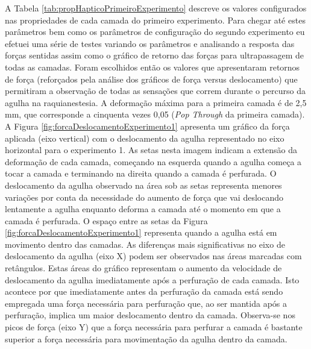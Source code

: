 A Tabela \ref{tab:propHapticoPrimeiroExperimento} descreve os valores configurados nas propriedades de cada camada do primeiro experimento. Para chegar até estes parâmetros bem como os parâmetros de configuração do segundo experimento eu efetuei uma série de testes variando os parâmetros e analisando a resposta das forças sentidas assim como o gráfico de retorno das forças para ultrapassagem de todas as camadas. Foram escolhidos então os valores que apresentaram retornos de força (reforçados pela análise dos gráficos de força versus deslocamento) que permitiram a observação de todas as sensações que correm durante o percurso da agulha na raquianestesia. A deformação máxima para a primeira camada é de 2,5 mm, que corresponde a cinquenta vezes 0,05 (\textit{Pop Through} da primeira camada). A Figura \ref{fig:forcaDeslocamentoExperimento1} apresenta um gráfico da força aplicada (eixo vertical) com o deslocamento da agulha representado no eixo horizontal para o experimento 1. As setas nesta imagem indicam a extensão da deformação de cada camada, começando na esquerda quando a agulha começa a tocar a camada e terminando na direita quando a camada é perfurada. O deslocamento da agulha observado na área sob as setas representa menores variações por conta da necessidade do aumento de força que vai deslocando lentamente a agulha enquanto deforma a camada até o momento em que a camada é perfurada. O espaço entre as setas da Figura \ref{fig:forcaDeslocamentoExperimento1} representa quando a agulha está em movimento dentro das camadas. 
As diferenças mais significativas no eixo de deslocamento da agulha (eixo X) podem ser observados nas áreas marcadas com retângulos. Estas áreas do gráfico representam o aumento da velocidade de deslocamento da agulha imediatamente após a perfuração de cada camada. Isto acontece por que imediatamente antes da perfuração da camada está sendo empregada uma força necessária para perfuração que, ao ser mantida após a perfuração, implica um maior deslocamento dentro da camada. Observa-se nos picos de força (eixo Y) que a força necessária para perfurar a camada é bastante superior a força necessária para movimentação da agulha dentro da camada. 

